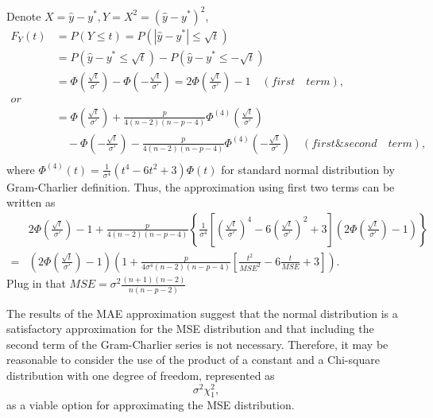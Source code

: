 Denote $X = \hat{y}-y^*, Y = X^2= (\hat{y}-y^*)^2 $,
$$\begin{aligned}
F_Y(t) &= P(Y\leq t) = P(|\hat{y}-y^*|\leq \sqrt{t})\\
		 &= P(\hat{y}-y^*\leq \sqrt{t})-P(\hat{y}-y^*\leq -\sqrt{t})\\
		 &= \Phi(\frac{\sqrt{t}}{\sigma'})-\Phi(-\frac{\sqrt{t}}{\sigma'}) = 2 \Phi(\frac{\sqrt{t}}{\sigma'})-1 \quad(first \quad term),\\
		 or\\
		 &= \Phi(\frac{\sqrt{t}}{\sigma'})+\frac{p}{4(n-2)(n-p-4)}\Phi^{(4)}(\frac{\sqrt{t}}{\sigma'})\\
		 &\quad-\Phi(-\frac{\sqrt{t}}{\sigma'})- \frac{p}{4(n-2)(n-p-4)}\Phi^{(4)}(-\frac{\sqrt{t}}{\sigma'})\quad(first\&second \quad term),\\
\end{aligned}$$
where $\Phi^{(4)}(t) = \frac{1}{\sigma^4}(t^4-6t^2+3)\Phi(t)$ for standard normal distribution by Gram-Charlier definition. Thus, the approximation using first two terms can be written as 
\begin{equation}\label{normal2}
\begin{aligned}
&2\Phi(\frac{\sqrt{t}}{\sigma'})-1+ \frac{p}{4(n-2)(n-p-4)}\left\{\frac{1}{\sigma^4}\left[(\frac{\sqrt{t}}{\sigma'})^4-6(\frac{\sqrt{t}}{\sigma'})^2+3\right]\left(2\Phi(\frac{\sqrt{t}}{\sigma'})-1\right)\right\}\\
=&\left(2\Phi(\frac{\sqrt{t}}{\sigma'})-1\right)\left( 1+\frac{p}{4\sigma^4(n-2)(n-p-4)}\left[\frac{t^2}{MSE^2}-6\frac{t}{MSE}+3\right]\right).
\end{aligned}\end{equation}
Plug in that $MSE = \sigma^2\frac{(n+1)(n-2)}{n(n-p-2)}$

The results of the MAE approximation suggest that the normal distribution is a satisfactory approximation for the MSE distribution and that including the second term of the Gram-Charlier series is not necessary. Therefore, it may be reasonable to consider the use of the product of a constant and a Chi-square distribution with one degree of freedom, represented as 
\begin{equation}\label{chis}\sigma^2 \chi^2_1,\end{equation}
as a viable option for approximating the MSE distribution.










